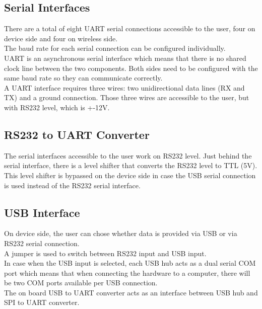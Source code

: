 \subsection{Serial Interfaces}
There are a total of eight UART serial connections accessible to the user, four on device side and four on wireless side.\\
The baud rate for each serial connection can be configured individually. \\
UART is an asynchronous serial interface which means that there is no shared clock line between the two components. Both sides need to be configured with the same baud rate so they can communicate correctly.\\
A UART interface requires three wires: two unidirectional data lines (RX and TX) and a ground connection. Those three wires are accessible to the user, but with RS232 level, which is +-12V.
%
\subsection{RS232 to UART Converter}
The serial interfaces accessible to the user work on RS232 level. Just behind the serial interface, there is a level shifter that converts the RS232 level to TTL (5V). \\
This level shifter is bypassed on the device side in case the USB serial connection is used instead of the RS232 serial interface.
%
\subsection{USB Interface}
On device side, the user can chose whether data is provided via USB or via RS232 serial connection.\\
A jumper is used to switch between RS232 input and USB input. \\
In case when the USB input is selected, each USB hub acts as a dual serial COM port which means that when connecting the hardware to a computer, there will be two COM ports available per USB connection. \\
The on board USB to UART converter acts as an interface between USB hub and SPI to UART converter.\\
%
